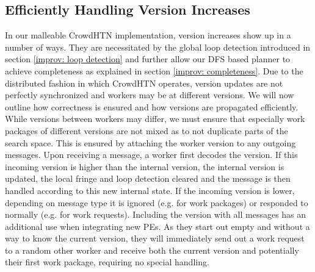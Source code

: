 \subsection{Efficiently Handling Version Increases}
\label{impl: version increase}
In our malleable CrowdHTN implementation, version increases show up in a number of ways. They are necessitated by the global loop detection introduced in section \ref{improv: loop detection} and further allow our DFS based planner to achieve completeness as explained in section \ref{improv: completeness}. Due to the distributed fashion in which CrowdHTN operates, version updates are not perfectly synchronized and workers may be at different versions. We will now outline how correctness is ensured and how versions are propagated efficiently. \\
While versions between workers may differ, we must ensure that especially work packages of different versions are not mixed as to not duplicate parts of the search space. This is ensured by attaching the worker version to any outgoing messages. Upon receiving a message, a worker first decodes the version. If this incoming version is higher than the internal version, the internal version is updated, the local fringe and loop detection cleared and the message is then handled according to this new internal state. If the incoming version is lower, depending on message type it is ignored (e.g. for work packages) or responded to normally (e.g. for work requests). Including the version with all messages has an additional use when integrating new PEs. As they start out empty and without a way to know the current version, they will immediately send out a work request to a random other worker and receive both the current version and potentially their first work package, requiring no special handling. \\
